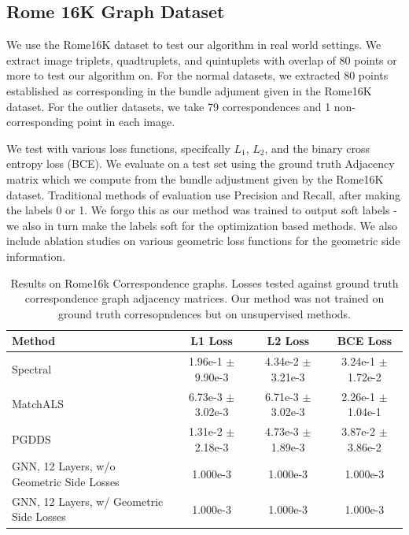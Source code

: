 \documentclass[10pt,twocolumn,letterpaper]{article}
\begin{document}
\subsection{Rome 16K Graph Dataset}
We  use the Rome16K dataset \cite{li2010location} to test our algorithm in real world settings.
We extract image triplets, quadtruplets, and quintuplets with overlap of 80 points or more to test our algorithm on. For the normal datasets, we extracted 80 points established as corresponding in the bundle adjument given in the Rome16K dataset. For the outlier datasets, we take 79 correspondences and 1 non-corresponding point in each image.

We test with various loss functions, specifcally $L_1$, $L_2$, and the binary cross entropy loss (BCE).
We evaluate on a test set using the ground truth Adjacency matrix which we compute from the bundle adjustment given by the Rome16K dataset.
Traditional methods of evaluation use Precision and Recall, after making the labels 0 or 1.
We forgo this as our method was trained to output soft labels - we also in turn make the labels soft for the optimization based methods.
We also include ablation studies on various geometric loss functions for the geometric side information.


\begin{table}
\begin{center}
\begin{tabular}{|l|c|c|c|}
\hline
Method & L1 Loss & L2 Loss & BCE Loss \\
\hline\hline\hline
Spectral                                  & 1.96e-1 $\pm$ 9.90e-3 & 4.34e-2 $\pm$ 3.21e-3 & 3.24e-1 $\pm$ 1.72e-2 \\ \hline
MatchALS                                  & 6.73e-3 $\pm$ 3.02e-3 & 6.71e-3 $\pm$ 3.02e-3 & 2.26e-1 $\pm$ 1.04e-1 \\ \hline
PGDDS                                     & 1.31e-2 $\pm$ 2.18e-3 & 4.73e-3 $\pm$ 1.89e-3 & 3.87e-2 $\pm$ 3.86e-2 \\ \hline
GNN, 12 Layers, w/o Geometric Side Losses & 1.000e-3 & 1.000e-3 & 1.000e-3 \\ \hline
GNN, 12 Layers, w/ Geometric Side Losses  & 1.000e-3 & 1.000e-3 & 1.000e-3 \\ \hline

\hline
\end{tabular}
\end{center}
\caption{
Results on Rome16k Correspondence graphs.
Losses tested against ground truth correspondence graph adjacency matrices.
Our method was not trained on ground truth corresopndences but on unsupervised methods.
}
\end{table}
\end{document}
